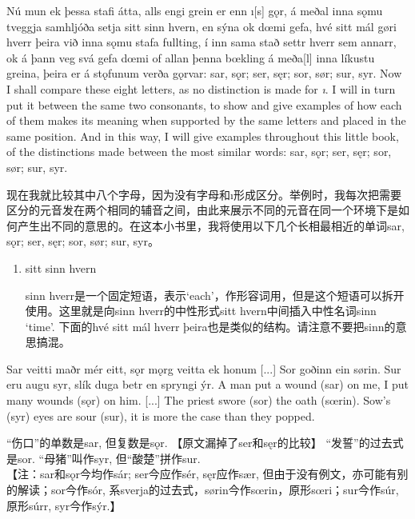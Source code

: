 \begin{paracol}{2}
  Nú mun ek þessa stafi átta, alls engi grein er enn ı[s] gǫr, á meðal inna sǫmu tveggja samhljóða setja sitt sinn hvern, en sýna ok dœmi gefa, hvé sitt mál gøri hverr þeira við inna sǫmu stafa fullting, í inn sama stað settr hverr sem annarr, ok á þann veg svá gefa dœmi of allan þenna bœkling á meða[l] inna líkustu greina, þeira er á stǫfunum verða gǫrvar: sar, sǫr; ser, sęr; sor, sør; sur, syr.
  \switchcolumn
  Now I shall compare these eight letters, as no distinction is made for \textit{ı}. I will in turn put it between the same two consonants, to show and give examples of how each of them makes its meaning when supported by the same letters and placed in the same position. And in this way, I will give examples throughout this little book, of the distinctions made between the most similar words: sar, sǫr; ser, sęr; sor, sør; sur, syr.
\end{paracol}
\begin{translation*}{}
  现在我就比较其中八个字母，因为没有字母和ı形成区分。举例时，我每次把需要区分的元音发在两个相同的辅音之间，由此来展示不同的元音在同一个环境下是如何产生出不同的意思的。在这本小书里，我将使用以下几个长相最相近的单词sar, sǫr; ser, sęr; sor, sør; sur, syr。
\end{translation*}
\begin{grammar*}{}
  \begin{enumerate}[leftmargin=*]
    \item sitt sinn hvern

          sinn hverr是一个固定短语，表示`each'，作形容词用，但是这个短语可以拆开使用。这里就是向sinn hverr的中性形式sitt hvern中间插入中性名词sinn `time'. 下面的hvé sitt mál hverr þeira也是类似的结构。请注意不要把sinn的意思搞混。
  \end{enumerate}
\end{grammar*}
\begin{paracol}{2}
  Sar veitti maðr mér eitt, sǫr mǫrg veitta ek honum [...] Sor goðinn ein sørin. Sur eru augu syr, slík duga betr en spryngi ýr.
  \switchcolumn
  A man put a wound (sar) on me, I put many wounds (sǫr) on him. [...] The priest swore (sor) the oath (sœrin). Sow's (syr) eyes are sour (sur), it is more the case than they popped.
\end{paracol}
\begin{translation*}{}
  “伤口”的单数是sar, 但复数是sǫr. 【原文漏掉了ser和sęr的比较】 “发誓”的过去式是sor. “母猪”叫作syr, 但“酸楚”拼作sur.\\

  【注：sar和sǫr今均作sár; ser今应作sér, sęr应作sær, 但由于没有例文，亦可能有别的解读；sor今作sór, 系sverja的过去式，sørin今作sœrin，原形sœri；sur今作súr, 原形súrr, syr今作sýr.】
\end{translation*}

